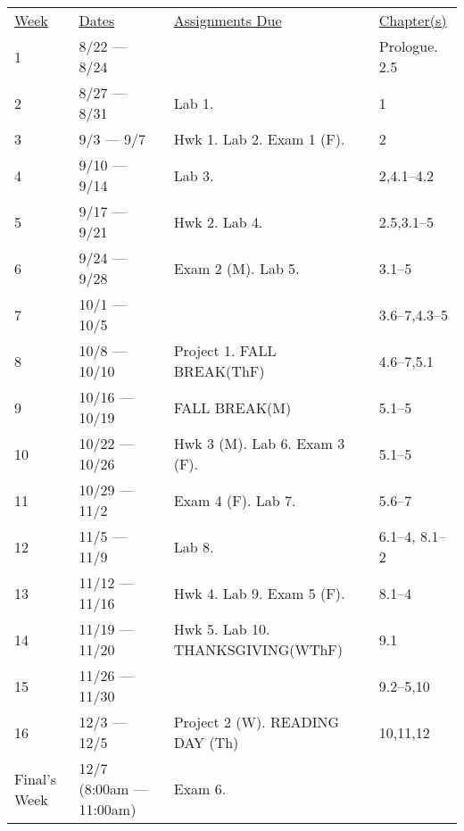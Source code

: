 \documentclass[10pt]{article}
\begin{document}
\begin{center}
\begin{tabular}{llll}
\underline{Week} & \underline{Dates} & \underline{Assignments Due} & \underline{Chapter(s)}\\
1 & 8/22 --- 8/24 &  &  Prologue. 2.5\\
2 & 8/27 --- 8/31 & Lab 1. &  1 \\
3 & 9/3 --- 9/7 & Hwk 1. Lab 2. Exam 1 (F).  &  2 \\
4 & 9/10 --- 9/14 & Lab 3. & 2,4.1--4.2 \\
5 & 9/17 --- 9/21 & Hwk 2. Lab 4. & 2.5,3.1--5\\
6 & 9/24 --- 9/28 & Exam 2 (M). Lab 5. & 3.1--5\\
7 & 10/1 --- 10/5 & & 3.6--7,4.3--5  \\
8 & 10/8 --- 10/10 & Project 1. FALL BREAK(ThF) & 4.6--7,5.1 \\
9 & 10/16 --- 10/19 & FALL BREAK(M)  & 5.1--5 \\
10 & 10/22 --- 10/26 & Hwk 3 (M). Lab 6. Exam 3 (F). & 5.1--5 \\
11 & 10/29 --- 11/2 &  Exam 4 (F). Lab 7. & 5.6--7 \\
12 & 11/5 --- 11/9 &  Lab 8. & 6.1--4, 8.1--2 \\
13 & 11/12 --- 11/16 & Hwk 4. Lab 9. Exam 5 (F). & 8.1--4  \\
14 & 11/19 --- 11/20 & Hwk 5. Lab 10. THANKSGIVING(WThF) & 9.1 \\
15 & 11/26 --- 11/30 &   & 9.2--5,10 \\
16 & 12/3 --- 12/5 & Project 2 (W). READING DAY (Th) & 10,11,12 \\
Final's Week & 12/7 (8:00am --- 11:00am) & Exam 6.  &  \\
\end{tabular}
\end{center}
\end{document}
